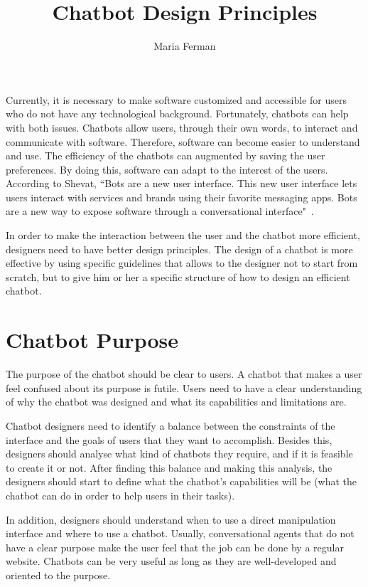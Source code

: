 \documentclass[a4paper,10pt]{article}
\title{Chatbot Design Principles}
\author{Maria Ferman}
\begin{document}
\maketitle
Currently, it is necessary to make software customized and accessible for users who do not have any technological background. Fortunately, chatbots can help with both issues. Chatbots allow users, through their own words, to interact and communicate with software. Therefore, software can become easier to understand and use. The efficiency of the chatbots can augmented by saving the user preferences. By doing this, software can adapt to the interest of the users. According to Shevat,  ``Bots are a new user interface. This new user interface lets users interact with services and brands using their favorite messaging apps. Bots are a new way to expose software through a conversational interface"~\cite{Shevat2017}. 

In order to make the interaction between the user and the chatbot more efficient, designers need to have better design principles. 
The design of a chatbot is more effective by using specific guidelines that allows to the designer not to start from scratch, but to give him or her a specific structure of how to design an efficient chatbot. 

\section{Chatbot Purpose}

The purpose of the chatbot should be clear to users. A chatbot that makes a user feel confused about its purpose is futile. Users need to have a clear understanding of why the chatbot was designed and what its capabilities and limitations are.

Chatbot designers need to identify a balance between the constraints of the interface and the goals of users that they want to accomplish. Besides this, designers should analyse what kind of chatbots they require, and if it is feasible to create it or not. After finding this balance and making this analysis, the designers should start to define what the chatbot's capabilities will be (what the chatbot can do in order to help users in their tasks). 

In addition, designers should understand when to use a direct manipulation interface and where to use a chatbot. Usually, conversational agents that do not have a clear purpose make the user feel that the job can be done by a regular website. Chatbots can be very useful as long as they are well-developed and oriented to the purpose. %
\end{document}
